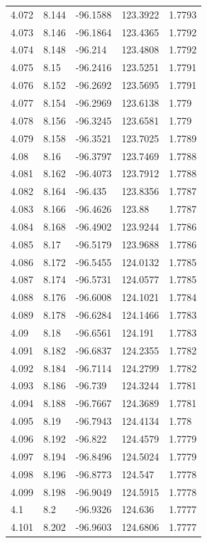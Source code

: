 \begin{tabular}{lllll}
4.072 & 8.144 & -96.1588 & 123.3922 & 1.7793 \\
4.073 & 8.146 & -96.1864 & 123.4365 & 1.7792 \\
4.074 & 8.148 & -96.214 & 123.4808 & 1.7792 \\
4.075 & 8.15 & -96.2416 & 123.5251 & 1.7791 \\
4.076 & 8.152 & -96.2692 & 123.5695 & 1.7791 \\
4.077 & 8.154 & -96.2969 & 123.6138 & 1.779 \\
4.078 & 8.156 & -96.3245 & 123.6581 & 1.779 \\
4.079 & 8.158 & -96.3521 & 123.7025 & 1.7789 \\
4.08 & 8.16 & -96.3797 & 123.7469 & 1.7788 \\
4.081 & 8.162 & -96.4073 & 123.7912 & 1.7788 \\
4.082 & 8.164 & -96.435 & 123.8356 & 1.7787 \\
4.083 & 8.166 & -96.4626 & 123.88 & 1.7787 \\
4.084 & 8.168 & -96.4902 & 123.9244 & 1.7786 \\
4.085 & 8.17 & -96.5179 & 123.9688 & 1.7786 \\
4.086 & 8.172 & -96.5455 & 124.0132 & 1.7785 \\
4.087 & 8.174 & -96.5731 & 124.0577 & 1.7785 \\
4.088 & 8.176 & -96.6008 & 124.1021 & 1.7784 \\
4.089 & 8.178 & -96.6284 & 124.1466 & 1.7783 \\
4.09 & 8.18 & -96.6561 & 124.191 & 1.7783 \\
4.091 & 8.182 & -96.6837 & 124.2355 & 1.7782 \\
4.092 & 8.184 & -96.7114 & 124.2799 & 1.7782 \\
4.093 & 8.186 & -96.739 & 124.3244 & 1.7781 \\
4.094 & 8.188 & -96.7667 & 124.3689 & 1.7781 \\
4.095 & 8.19 & -96.7943 & 124.4134 & 1.778 \\
4.096 & 8.192 & -96.822 & 124.4579 & 1.7779 \\
4.097 & 8.194 & -96.8496 & 124.5024 & 1.7779 \\
4.098 & 8.196 & -96.8773 & 124.547 & 1.7778 \\
4.099 & 8.198 & -96.9049 & 124.5915 & 1.7778 \\
4.1 & 8.2 & -96.9326 & 124.636 & 1.7777 \\
4.101 & 8.202 & -96.9603 & 124.6806 & 1.7777 \\

\end{tabular}
